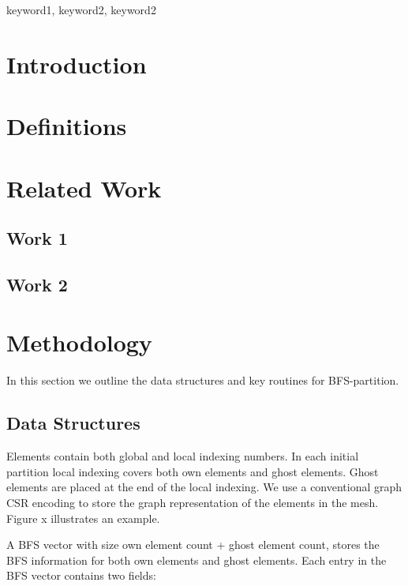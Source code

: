 \documentclass[conference]{IEEEtran}
\begin{document}
\begin{IEEEkeywords}
keyword1, keyword2, keyword2
\end{IEEEkeywords}

\section{Introduction}
\lipsum[1-1]

\section{Definitions}
\lipsum[1-1]

\section{Related Work}

\subsection{Work 1}

\lipsum[1-1]
\cite{parmetis}

\subsection{Work 2}

\lipsum[1-1]

\section{Methodology}
In this section we outline the data structures and key routines for BFS-partition.


\subsection{Data Structures}
Elements contain both global and local indexing numbers. In each initial partition local indexing covers both own elements and ghost elements. Ghost elements are placed at the end of the local indexing. We use a conventional graph CSR encoding to store the graph representation of the elements in the mesh. Figure x illustrates an example.

A BFS vector with size own element count + ghost element count, stores the BFS information for both own elements and ghost elements. Each entry in the BFS vector contains two fields: 
\end{document}
